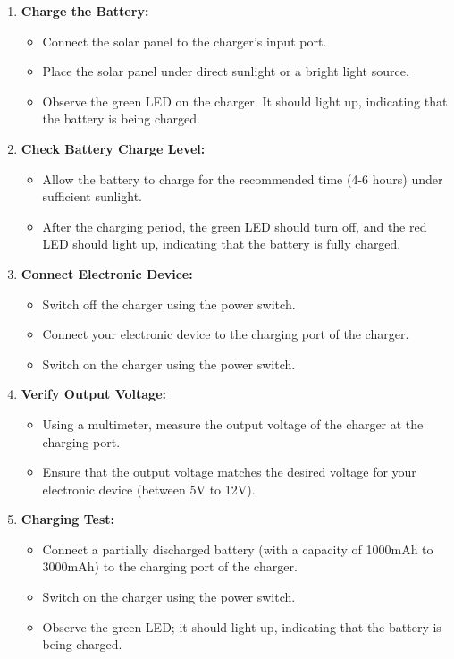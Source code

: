 \documentclass[twocolumn]{article}
\begin{document}
\begin{enumerate}
  \item \textbf{Charge the Battery:}
    \begin{itemize}
      \item Connect the solar panel to the charger's input port.
      \item Place the solar panel under direct sunlight or a bright light source.
      \item Observe the green LED on the charger. It should light up, indicating that the battery is being charged.
    \end{itemize}

  \item \textbf{Check Battery Charge Level:}
    \begin{itemize}
      \item Allow the battery to charge for the recommended time (4-6 hours) under sufficient sunlight.
      \item After the charging period, the green LED should turn off, and the red LED should light up, indicating that the battery is fully charged.
    \end{itemize}

  \item \textbf{Connect Electronic Device:}
    \begin{itemize}
      \item Switch off the charger using the power switch.
      \item Connect your electronic device to the charging port of the charger.
      \item Switch on the charger using the power switch.
    \end{itemize}

  \item \textbf{Verify Output Voltage:}
    \begin{itemize}
      \item Using a multimeter, measure the output voltage of the charger at the charging port.
      \item Ensure that the output voltage matches the desired voltage for your electronic device (between 5V to 12V).
    \end{itemize}

  \item \textbf{Charging Test:}
    \begin{itemize}
      \item Connect a partially discharged battery (with a capacity of 1000mAh to 3000mAh) to the charging port of the charger.
      \item Switch on the charger using the power switch.
      \item Observe the green LED; it should light up, indicating that the battery is being charged.
    \end{itemize}


\end{enumerate}
\end{document}
